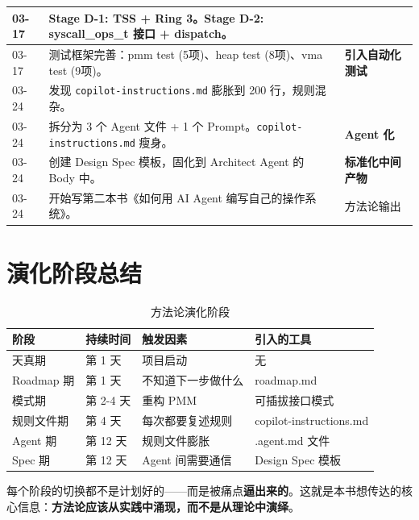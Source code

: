 \begin{longtable}{lp{9cm}l}
03-17 & Stage D-1: TSS + Ring 3。Stage D-2: syscall\_ops\_t 接口 + dispatch。 & \\
\midrule

03-17 & 测试框架完善：pmm test (5项)、heap test (8项)、vma test (9项)。 & \textbf{引入自动化测试} \\
\midrule

03-24 & 发现 \texttt{copilot-instructions.md} 膨胀到 200 行，规则混杂。 & \\
\midrule

03-24 & 拆分为 3 个 Agent 文件 + 1 个 Prompt。\texttt{copilot-instructions.md} 瘦身。 & \textbf{Agent 化} \\
\midrule

03-24 & 创建 Design Spec 模板，固化到 Architect Agent 的 Body 中。 & \textbf{标准化中间产物} \\
\midrule

03-24 & 开始写第二本书《如何用 AI Agent 编写自己的操作系统》。 & 方法论输出 \\

\bottomrule
\end{longtable}

\section{演化阶段总结}

\begin{table}[H]
\centering
\begin{tabular}{llll}
\toprule
\textbf{阶段} & \textbf{持续时间} & \textbf{触发因素} & \textbf{引入的工具} \\
\midrule
天真期 & 第 1 天 & 项目启动 & 无 \\
Roadmap 期 & 第 1 天 & 不知道下一步做什么 & roadmap.md \\
模式期 & 第 2-4 天 & 重构 PMM & 可插拔接口模式 \\
规则文件期 & 第 4 天 & 每次都要复述规则 & copilot-instructions.md \\
Agent 期 & 第 12 天 & 规则文件膨胀 & .agent.md 文件 \\
Spec 期 & 第 12 天 & Agent 间需要通信 & Design Spec 模板 \\
\bottomrule
\end{tabular}
\caption{方法论演化阶段}
\end{table}

每个阶段的切换都不是计划好的——而是被痛点\textbf{逼出来的}。这就是本书想传达的核心信息：\textbf{方法论应该从实践中涌现，而不是从理论中演绎}。
